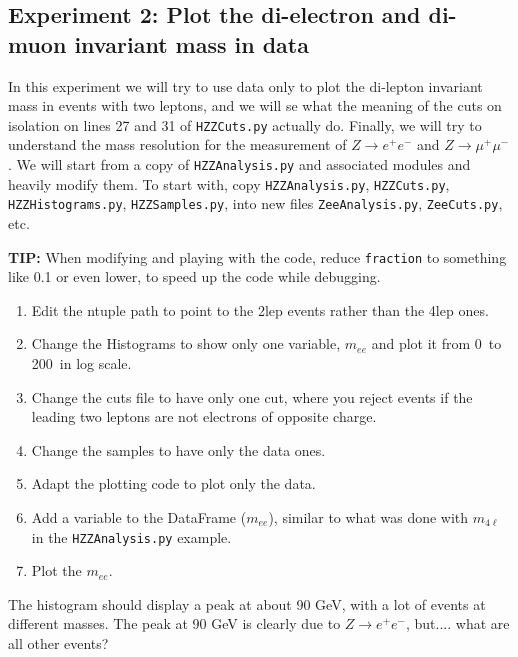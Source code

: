 \subsection{Experiment 2: Plot the di-electron and di-muon invariant mass in data}

In this experiment we will try to use data only to plot the di-lepton invariant mass in events with two leptons, and we will se what the meaning of the cuts on isolation on lines 27 and 31 of \verb|HZZCuts.py| actually do. Finally, we will try to understand the mass resolution for the measurement of $Z\rightarrow e^+e^-$ and $Z\rightarrow \mu^+\mu^-$. We will start from a copy of \verb|HZZAnalysis.py| and associated modules and heavily modify them. To start with, copy \verb|HZZAnalysis.py|, \verb|HZZCuts.py|, \verb|HZZHistograms.py|, \verb|HZZSamples.py|, into new files \verb|ZeeAnalysis.py|, \verb|ZeeCuts.py|, etc. 

\begin{mybox}
\textbf{TIP:} When modifying and playing with the code, reduce \verb|fraction| to something like 0.1 or even lower, to speed up the code while debugging.
\end{mybox}


\begin{enumerate} 
\item Edit the ntuple path to point to the 2lep events rather than the 4lep ones. 
\item Change the Histograms to show only one variable, $m_{ee}$ and plot it from 0\ \GeV to 200\ \GeV in log scale. 
\item Change the cuts file to have only one cut, where you reject events if the leading two leptons are not electrons of opposite charge. 
\item Change the samples to have only the data ones. 
\item Adapt the plotting code to plot only the data. 
\item Add a variable to the DataFrame ($m_{ee}$), similar to what was done with $m_{4\ell}$ in the \verb|HZZAnalysis.py| example.
\item Plot the $m_{ee}$. 
\end{enumerate}

\begin{mybox}
The histogram should display a peak at about 90 GeV, with a lot of events at different masses. The peak at 90 GeV is clearly due to $Z\rightarrow e^+ e^-$, but.... what are all other events?
\end{mybox}

